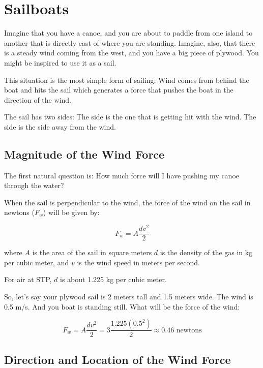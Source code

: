 \chapter{Sailboats}

Imagine that you have a canoe, and you are about to paddle from one island to another that is directly east of where you are standing.  Imagine, also, that there 
is a steady wind coming from the west, and you have a big piece of plywood.  You might be inspired to use it as a sail.

This situation is the most simple form of sailing: Wind comes from behind the boat and hits the sail which generates a force that pushes the 
boat in the direction of the wind.

The sail has two sides:  The  side is the one that is getting hit with the wind.  The  side is the side away from the wind.

\section{Magnitude of the Wind Force}

The first natural question is: How much force will I have pushing my canoe through the water?

\begin{mdframed}[style=important, frametitle={Wind Force}]

When the sail is perpendicular to the wind,  the force of the wind on the sail in newtons ($F_w$) will be given by:

$$F_w = A \frac{d v^2}{2}$$

where $A$ is the area of the sail in square meters  $d$ is the density of the gas in kg per cubic meter, and $v$ is the wind speed in meters per second.

For air at STP,  $d$ is about 1.225 kg per cubic meter.

\end{mdframed}

So,  let's say your plywood sail is 2 meters tall and 1.5 meters wide.  The wind is 0.5 m/s.  And you boat is standing still.   What will be the force of the wind:

$$F_w  = A \frac{d v^2}{2} = 3 \frac{1.225 (0.5^2)}{2}  \approx 0.46 \text{ newtons}$$

\section{Direction and Location of the Wind Force}

